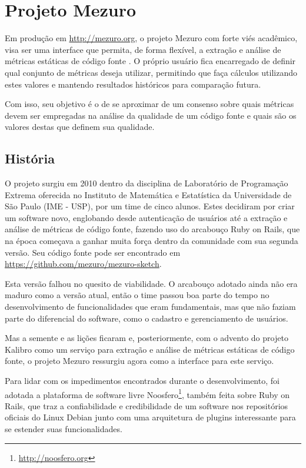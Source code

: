 \documentclass[12pt]{article}
\begin{document}
\section{Projeto Mezuro} \label{sec:projeto-mezuro}
Em produção em \url{http://mezuro.org}, o projeto Mezuro com forte viés acadêmico, visa ser uma interface que permita, de forma flexível, a extração e análise de métricas estáticas de código fonte \cite{wcmcww95}. O próprio usuário fica encarregado de definir qual conjunto de métricas deseja utilizar, permitindo que faça cálculos utilizando estes valores e mantendo resultados históricos para comparação futura.

Com isso, seu objetivo é o de se aproximar de um consenso sobre quais métricas devem ser empregadas na análise da qualidade de um código fonte e quais são os valores destas que definem sua qualidade.

  \subsection{História} \label{subsec:historia}
  O projeto surgiu em 2010 dentro da disciplina de Laboratório de Programação Extrema oferecida no Instituto de Matemática e Estatística da Universidade de São Paulo (IME - USP), por um time de cinco alunos. Estes decidiram por criar um software novo, englobando desde autenticação de usuários até a extração e análise de métricas de código fonte, fazendo uso do arcabouço Ruby on Rails, que na época começava a ganhar muita força dentro da comunidade com sua segunda versão. Seu código fonte pode ser encontrado em \url{https://github.com/mezuro/mezuro-sketch}.

  Esta versão falhou no quesito de viabilidade. O arcabouço adotado ainda não era maduro como a versão atual, então o time passou boa parte do tempo no desenvolvimento de funcionalidades que eram fundamentais, mas que não faziam parte do diferencial do software, como o cadastro e gerenciamento de usuários.

  Mas a semente e as lições ficaram e, posteriormente, com o advento do projeto Kalibro \cite{of13} como um serviço para extração e análise de métricas estáticas de código fonte, o projeto Mezuro ressurgiu agora como a interface para este serviço.

  Para lidar com os impedimentos encontrados durante o desenvolvimento, foi adotada a plataforma de software livre Noosfero\footnote{\url{http://noosfero.org}}, também feita sobre Ruby on Rails, que traz a confiabilidade e credibilidade de um software nos repositórios oficiais do Linux Debian junto com uma arquitetura de plugins interessante para se estender suas funcionalidades.
\end{document}
